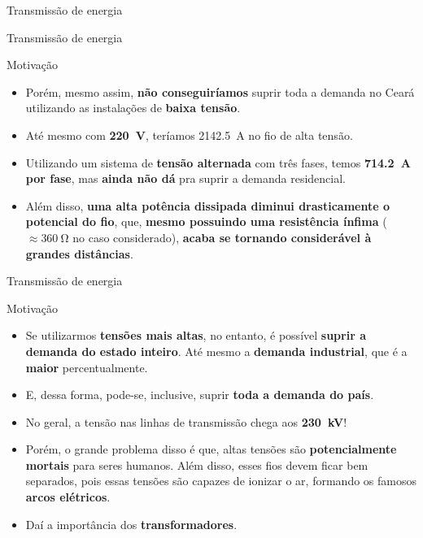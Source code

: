 \begin{frame}{Transmissão de energia}
\begin{minipage}{0.49\linewidth}
	\end{minipage}

\end{frame}


\begin{frame}{Transmissão de energia}
	\begin{block}{Motivação}
		\begin{itemize}
			\item Porém, mesmo assim, \textbf{não conseguiríamos} suprir toda a demanda no Ceará utilizando as instalações de \textbf{baixa tensão}.
			\item Até mesmo com \textbf{\SI{220}{\volt}}, teríamos \SI{2142.5}{\ampere} no fio de alta tensão.
			\item Utilizando um sistema de \textbf{tensão alternada} com três fases, temos \textbf{\SI{714.2}{\ampere} por fase}, mas \textbf{ainda não dá} pra suprir a demanda residencial.
			\item Além disso, \textbf{uma alta potência dissipada diminui drasticamente o potencial do fio}, que, \textbf{mesmo possuindo uma resistência ínfima} ($ \approx \SI{360}{\ohm} $ no caso considerado), \textbf{acaba se tornando considerável à grandes distâncias}.
		\end{itemize}
	\end{block}

\end{frame}


\begin{frame}{Transmissão de energia}
	\begin{block}{Motivação}
		\begin{itemize}
			\item Se utilizarmos \textbf{tensões mais altas}, no entanto, é possível \textbf{suprir a demanda do estado inteiro}. Até mesmo a \textbf{demanda industrial}, que é a \textbf{maior} percentualmente.
			\item E, dessa forma, pode-se, inclusive, suprir \textbf{toda a demanda do país}.
			\item No geral, a tensão nas linhas de transmissão chega aos \textbf{\SI{230}{\kilo\volt}}!
			\item Porém, o grande problema disso é que, altas tensões são \textbf{potencialmente mortais} para seres humanos. Além disso, esses fios devem ficar bem separados, pois essas tensões são capazes de ionizar o ar, formando os famosos \textbf{arcos elétricos}.
			\item Daí a importância dos \textbf{transformadores}.
		\end{itemize}
	\end{block}

\end{frame}


